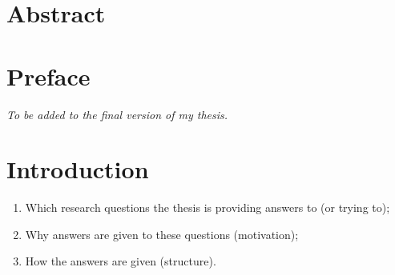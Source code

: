 \documentclass[
10pt, %
a4paper, %
oneside, %
headinclude,footinclude, %
] {book}%
\begin{document}

\chapter*{Abstract}



\clearpage
\setcounter{tocdepth}{3} %
\tableofcontents %







\chapter*{Preface}

\textit{To be added to the final version of my thesis.}



\chapter{Introduction}

\begin{enumerate}
\item Which research questions the thesis is providing answers to (or trying to);
\item Why answers are given to these questions (motivation);
\item How the answers are given (structure).
\end{enumerate}
\end{document}
